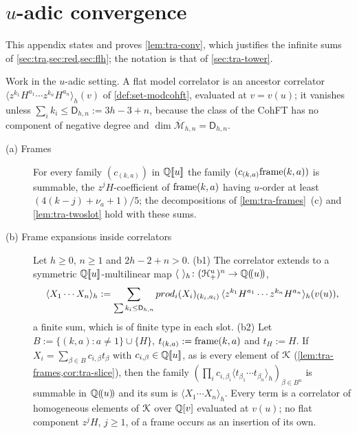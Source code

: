 
\section{$u$-adic convergence}
\label{sec:tra-convproof}

This appendix states and proves \cref{lem:tra-conv}, which justifies the infinite sums of \cref{sec:tra,sec:red,sec:flh}; the notation is that of \cref{sec:tra-tower}.

\begin{lem}
\label{lem:tra-conv}
Work in the $u$-adic setting. A flat model correlator is an ancestor correlator $\langle z^{k_1}H^{a_1}\cdots z^{k_n}H^{a_n}\rangle_h(v)$ of \cref{def:set-modcohft}, evaluated at $v = v(u)$; it vanishes unless $\sum_ik_i\leq\mathsf D_{h,n} := 3h-3+n$, because the class of the CohFT has no component of negative degree and $\dim\overline{\mathcal M}_{h,n} = \mathsf D_{h,n}$.
\begin{description}
\item[(a) Frames] For every family $(c_{(k,a)})$ in $\mathbb{Q}[\![ u ]\!]$ the family $(c_{(k,a)}\mathrm{frame}(k,a))$ is summable, the $z^jH$-coefficient of $\mathrm{frame}(k,a)$ having $u$-order at least $(4(k-j)+\nu_a+1)/5$; the decompositions of \cref{lem:tra-frames}~(c) and \cref{lem:tra-twoslot} hold with these sums.
\item[(b) Frame expansions inside correlators] Let $h\geq 0$, $n\geq 1$ and $2h-2+n>0$.
(b1) The correlator extends to a symmetric $\mathbb{Q}[\![ u ]\!]$-multilinear map $\langle\ \rangle_h\colon(\cH^u_+)^n\to\bbQ\lser{u}$,
\[
\langle X_1\cdots X_n\rangle_h := \sum_{\sum k_i\leq\mathsf D_{h,n}}\\prod_i(X_i)_{(k_i,a_i)}\,\langle z^{k_1}H^{a_1}\cdots z^{k_n}H^{a_n}\rangle_h(v(u)),
\]
a finite sum, which is of finite type in each slot.
(b2) Let $B := \{(k,a) : a\neq 1\}\cup\{H\}$, $t_{(k,a)} := \mathrm{frame}(k,a)$ and $t_H := H$. If $X_i = \sum_{\beta\in B}c_{i,\beta}t_\beta$ with $c_{i,\beta}\in\mathbb{Q}[\![ u ]\!]$, as is every element of $\mathcal{K}$ (\cref{lem:tra-frames,cor:tra-slice}), then the family $(\prod_ic_{i,\beta_i}\langle t_{\beta_1}\cdots t_{\beta_n}\rangle_h)_{\beta\in B^n}$ is summable in $\mathbb{Q}(\!(u)\!)$ and its sum is $\langle X_1\cdots X_n\rangle_h$. Every term is a correlator of homogeneous elements of $\mathcal{K}$ over $\mathbb{Q}[v]$ evaluated at $v(u)$; no flat component $z^jH$, $j\geq 1$, of a frame occurs as an insertion of its own.

\end{description}
\end{lem}
